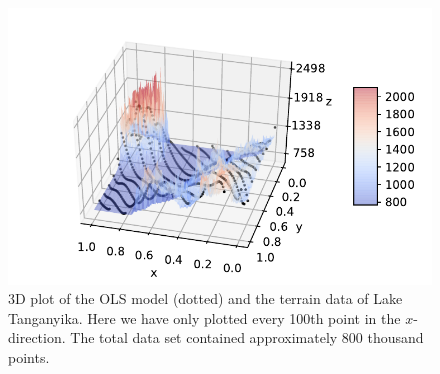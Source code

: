 \documentclass[a4paper, 10pt]{article}
\begin{document}
\begin{figure}[H]
	\includegraphics[scale=1]{figs/3dmodel_OLS_terrain.pdf}
	\caption{3D plot of the OLS model (dotted) and the terrain data of Lake Tanganyika. Here we have only plotted every 100th point in the $x$-direction. The total data set contained approximately 800 thousand points.}
	\label{fig:3d_OLS_terrain}

\end{figure}
\end{document}
